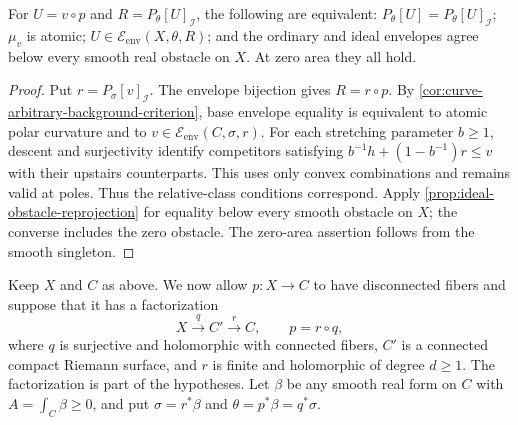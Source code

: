 \begin{corollary}\label{curve-backgrounds647:all-obstacles}
For $U=v\circ p$ and $R=P_\theta[U]_{\mathcal I}$, the following
are equivalent: $P_\theta[U]=P_\theta[U]_{\mathcal I}$;
$\mu_v$ is atomic; $U\in\mathcal E_{\mathrm{env}}(X,\theta,R)$;
and the ordinary and ideal envelopes agree below every smooth
real obstacle on $X$. At zero area they all hold.
\end{corollary}
\begin{proof}
Put $r=P_\sigma[v]_{\mathcal I}$. The envelope bijection gives
$R=r\circ p$. By \cref{cor:curve-arbitrary-background-criterion},
base envelope equality is equivalent to atomic polar curvature
and to $v\in\mathcal E_{\mathrm{env}}(C,\sigma,r)$.
For each stretching parameter $b\geq1$, descent and surjectivity
identify competitors satisfying
$b^{-1}h+(1-b^{-1})r\leq v$ with their upstairs counterparts.
This uses only convex combinations and remains valid at poles.
Thus the relative-class conditions correspond. Apply
\cref{prop:ideal-obstacle-reprojection} for equality below every
smooth obstacle on $X$; the converse includes the zero obstacle.
The zero-area assertion follows from the smooth singleton.
\end{proof}

Keep $X$ and $C$ as above. We now allow $p:X\to C$ to have
disconnected fibers and suppose that it has a factorization
\[
 X\xrightarrow{q}C'\xrightarrow{r}C,
 \qquad p=r\circ q,
\]
where $q$ is surjective and holomorphic with connected fibers,
$C'$ is a connected compact Riemann surface, and $r$ is finite
and holomorphic of degree $d\geq1$. The factorization is part
of the hypotheses.
Let $\beta$ be any smooth real form on $C$ with
$A=\int_C\beta\geq0$, and put $\sigma=r^*\beta$ and
$\theta=p^*\beta=q^*\sigma$.

